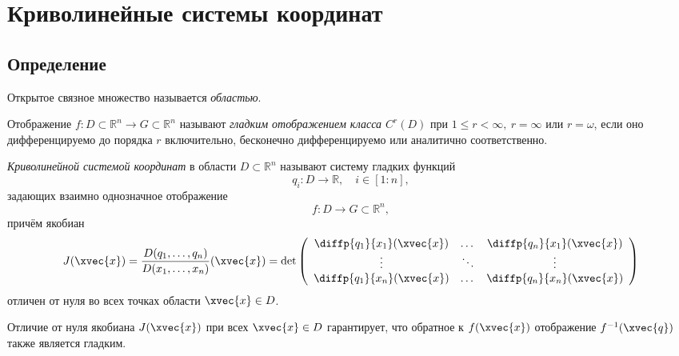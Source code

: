 \section{Криволинейные системы координат}

\subsection{Определение}

\begin{definition}
  Открытое связное множество называется \textit{областью}.
\end{definition}

\begin{definition}
  Отображение $f : D \subset \mathbb{R}^n \to G \subset \mathbb{R}^n$ называют
  \textit{гладким отображением класса $C^r(D)$} при
  $1 \leqslant r < \infty,~r = \infty$ или $r = \omega$, если оно
  дифференцируемо до порядка $r$ включительно, бесконечно дифференцируемо или
  аналитично соответственно.
\end{definition}

\begin{definition}
  \textit{Криволинейной системой координат} в области $D \subset \mathbb{R}^n$
  называют систему гладких функций
  \begin{equation*}
    q_i : D \to \mathbb{R}, \quad i \in [1:n],
  \end{equation*}
  задающих взаимно однозначное отображение
  \begin{equation*}
    f : D \to G \subset \mathbb{R}^n,
  \end{equation*}
  причём якобиан
  \begin{equation}
    J(\xvec{x}) = \frac{D(q_1, \dots, q_n)}{D(x_1, \dots, x_n)}(\xvec{x}) = \det
    \left(
    \begin{array}{c c c}
      \diffp{q_1}{{x_1}}(\xvec{x}) & \dots & \diffp{q_n}{{x_1}}(\xvec{x}) \\
      \vdots & \ddots & \vdots \\
      \diffp{q_1}{{x_n}}(\xvec{x}) & \dots & \diffp{q_n}{{x_n}}(\xvec{x})
    \end{array}
    \right)
  \end{equation}
  отличен от нуля во всех точках области $\xvec{x} \in D$.
\end{definition}

\begin{remark}
  Отличие от нуля якобиана $J(\xvec{x})$ при всех $\xvec{x} \in D$ гарантирует,
  что обратное к $f(\xvec{x})$ отображение $f^{-1}(\xvec{q})$ также является
  гладким.
\end{remark}

